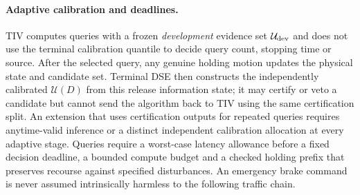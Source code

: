 \documentclass[10pt]{article}
\begin{document}
\paragraph{Adaptive calibration and deadlines.}
TIV computes queries with a frozen \emph{development} evidence set $\mathcal U_{\rm dev}$ and does not use the terminal calibration quantile to decide query count, stopping time or source. After the selected query, any genuine holding motion updates the physical state and candidate set. Terminal DSE then constructs the independently calibrated $\mathcal U(D)$ from this release information state; it may certify or veto a candidate but cannot send the algorithm back to TIV using the same certification split. An extension that uses certification outputs for repeated queries requires anytime-valid inference or a distinct independent calibration allocation at every adaptive stage. Queries require a worst-case latency allowance before a fixed decision deadline, a bounded compute budget and a checked holding prefix that preserves recourse against specified disturbances. An emergency brake command is never assumed intrinsically harmless to the following traffic chain.
\end{document}
